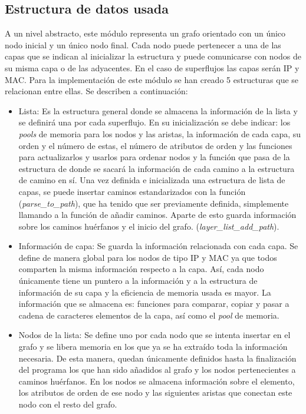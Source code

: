 \documentclass[twoside, 12pt]{epstfg}
\begin{document}
\subsection{Estructura de datos usada}
A un nivel abstracto, este módulo representa un grafo orientado con un único nodo inicial y un único nodo final. Cada nodo puede pertenecer a una de las capas que se indican al inicializar la estructura y puede comunicarse con nodos de su misma capa o de las adyacentes. En el caso de superflujos las capas serán IP y MAC. Para la implementación de este módulo se han creado 5 estructuras que se relacionan entre ellas. Se describen a continuación:
\begin{itemize}
    \item Lista: Es la estructura general donde se almacena la información de la lista y se definirá una por cada superflujo. En su inicialización se debe indicar: los \textit{pools} de memoria para los nodos y las aristas, la información de cada capa, su orden y el número de estas, el número de atributos de orden y las funciones para actualizarlos y usarlos para ordenar nodos y la función que pasa de la estructura de donde se sacará la información de cada camino a la estructura de camino en sí. Una vez definida e inicializada una estructura de lista de capas, se puede insertar caminos estandarizados con la función (\textit{parse\_to\_path}), que ha tenido que ser previamente definida, simplemente llamando a la función de añadir caminos. Aparte de esto guarda información sobre los caminos huérfanos y el inicio del grafo.
    (\textit{layer\_list\_add\_path}).
    \item Información de capa: Se guarda la información relacionada con cada capa. Se define de manera global para los nodos de tipo IP y MAC ya que todos comparten la misma información respecto a la capa. Así, cada nodo únicamente tiene un puntero a la información y a la estructura de información de su capa y la eficiencia de memoria usada es mayor. La información que se almacena es: funciones para comparar, copiar y pasar a cadena de caracteres elementos de la capa, así como el \textit{pool} de memoria.
    \item Nodos de la lista: Se define uno por cada nodo que se intenta insertar en el grafo y se libera memoria en los que ya se ha extraído toda la información necesaria. De esta manera, quedan únicamente definidos hasta la finalización del programa los que han sido añadidos al grafo y los nodos pertenecientes a caminos huérfanos.  En los nodos se almacena información sobre el elemento, los atributos de orden de ese nodo y las siguientes aristas que conectan este nodo con el resto del grafo.

\end{itemize}
\end{document}

